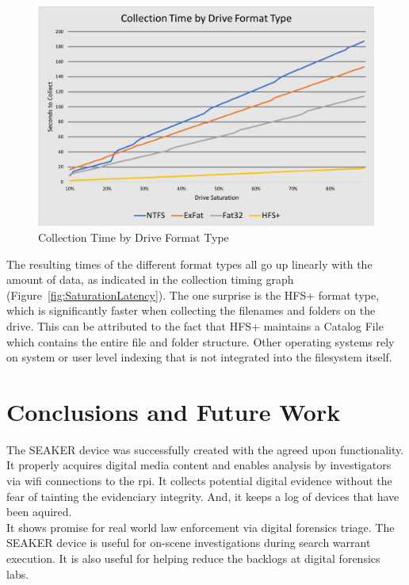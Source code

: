 \documentclass[12pt]{article}
\begin{document}
\begin{figure}[H]
  \begin{center}
  \includegraphics[width=13cm]{images/TimeVsDriveType.png}
  \caption{Collection Time by Drive Format Type}
  \label{fig:DriveType}
  \end{center}
\end{figure}

The resulting times of the different format types all go up linearly with the 
amount of data, as indicated in the collection timing graph
(Figure~\ref{fig:SaturationLatency}).
The one surprise is the HFS+ format type, which is significantly
faster when collecting the filenames and folders on the drive.  This can be
attributed to the fact that HFS+ maintains a Catalog File which contains the 
entire file and folder structure.  Other operating systems rely on system or user
level indexing that is not integrated into the filesystem itself.

\section{Conclusions and Future Work}
\label{sect-conclusionAndFutureWork}

The SEAKER device was successfully created with the agreed upon functionality.  It
properly acquires digital media content and enables analysis by investigators
via \gls{wifi} connections to the \gls{rpi}.  It collects potential digital
evidence without the fear of tainting the evidenciary integrity.  And, it keeps a
log of devices that have been aquired.\\

It shows promise for real world law enforcement via digital forensics triage.  The
SEAKER device is useful for on-scene investigations during search warrant
execution.  It is also useful for helping reduce the backlogs at digital
forensics labs.\\
\end{document}
